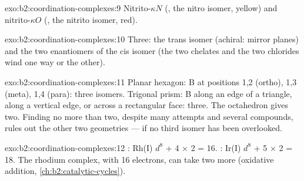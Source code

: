 \begin{solution}{exo:b2:coordination-complexes:9}
Nitrito-$\kappa N$ (, the nitro isomer, yellow) and nitrito-$\kappa O$
(, the nitrito isomer, red).
\end{solution}

\begin{solution}{exo:b2:coordination-complexes:10}
Three: the trans isomer (achiral: mirror planes) and the two enantiomers of the cis
isomer (the two chelates and the two chlorides wind one way or the other).
\end{solution}

\begin{solution}{exo:b2:coordination-complexes:11}
Planar hexagon: B at positions 1,2 (ortho), 1,3 (meta), 1,4 (para): three isomers.
Trigonal prism: B along an edge of a triangle, along a vertical edge, or across a
rectangular face: three. The octahedron gives two. Finding no more than two, despite
many attempts and several compounds, rules out the other two geometries --- if no
third isomer has been overlooked.
\end{solution}

\begin{solution}{exo:b2:coordination-complexes:12}
: Rh(I) $d^8$ + 4 × 2 = 16. : Ir(I) $d^8$ + 5 × 2 =
18. The rhodium complex, with 16 electrons, can take two more (oxidative addition,
\cref{ch:b2:catalytic-cycles}).
\end{solution}

